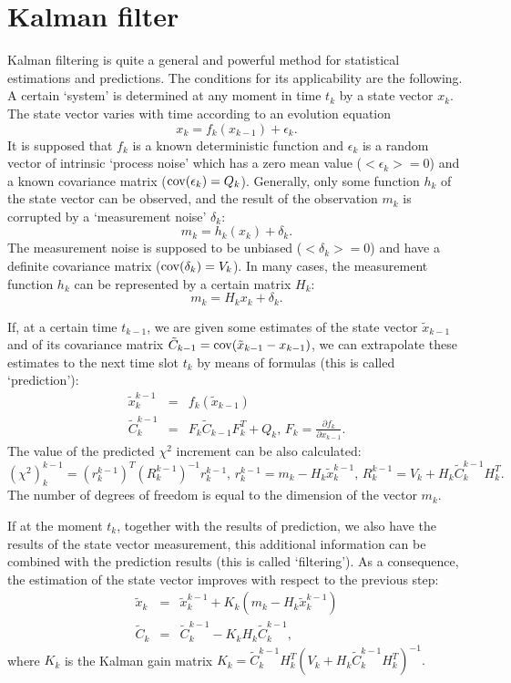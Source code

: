 \documentclass[12pt,a4paper,twoside]{article}
\begin{document}
{\section{Kalman filter}
Kalman filtering is quite a general and  powerful method for statistical
estimations and predictions. The conditions for its 
applicability are the following. A certain `system' is
determined at any moment in time $t_k$ by a state vector $x_k$.  The state
vector varies with time according to an evolution
equation
\[ x_k = f_k(x_{k-1}) + \epsilon_k .  \]
It is supposed that $f_k$ is
a known deterministic function and $\epsilon_k$ is a random vector of intrinsic
`process noise' which has a zero mean value ($<\epsilon_k> = 0$) and a known
covariance matrix (${\rm cov}(\epsilon_k) = Q_k$). Generally, only some function
$h_k$ of the state vector can be observed, and the result of the
observation $m_k$ is
corrupted by a `measurement noise' $\delta_k$:
\[ m_k = h_k(x_k) + \delta_k. \]
The measurement noise is supposed to be unbiased ($<\delta_k> = 0$) and have a
definite covariance matrix (${\rm cov}(\delta_k) = V_k$). In many cases, the
measurement function $h_k$ can be represented by a
certain matrix $H_k$:
\[ m_k = H_kx_k + \delta_k .\]

If, at a certain time $t_{k-1}$, we are given 
some estimates of the state vector $\tilde{x}_{k-1}$ and of
its covariance matrix $\tilde{C}_{k-1} = {\rm cov}(\tilde{x}_{k-1}-x_{k-1})$,
we can extrapolate
these estimates to the next time slot $t_k$ by means of formulas
(this is called `prediction'):
\begin{eqnarray}
  \tilde{x}_k^{k-1} &=& f_k(\tilde{x}_{k-1}) \nonumber \\
  \tilde{C}_k^{k-1} &=& F_k\tilde{C}_{k-1}F_k^T + Q_k\mbox{,\ \ \ \ }
  F_k=\frac{\displaystyle\partial f_k}{\displaystyle\partial x_{k-1}} . 
  \nonumber
\end{eqnarray}
The value of the predicted $\chi^2$ increment can be also calculated:
\begin{equation}
  (\chi^2)_k^{k-1} = (r_k^{k-1})^T(R_k^{k-1})^{-1}r_k^{k-1}\mbox{,\ \ \ \ }
  r_k^{k-1} = m_k - H_k\tilde{x}_k^{k-1}\mbox{,\ \ \ \ }
  R_k^{k-1} = V_k + H_k\tilde{C}_k^{k-1}H_k^T . 
  \nonumber
\end{equation}
The number of degrees of freedom is equal to the dimension of the vector $m_k$.

If at the moment $t_k$, together with the results of prediction, we also
have the results of the state vector measurement, 
this additional information can be combined with the prediction  results
(this is called `filtering'). As a consequence, the estimation of the state
vector improves with respect to the previous step:
\begin{eqnarray}
  \tilde{x}_k &=& \tilde{x}_k^{k-1} + K_k(m_k - H_k\tilde{x}_k^{k-1})\nonumber\\
  \tilde{C}_k &=& \tilde{C}_k^{k-1} - K_kH_k\tilde{C}_k^{k-1},
  \nonumber
\end{eqnarray}
where $K_k$ is the Kalman gain matrix
$
K_k = \tilde{C}_k^{k-1}H_k^T(V_k + H_k\tilde{C}_k^{k-1}H_k^T)^{-1}.
$

}
\end{document}
